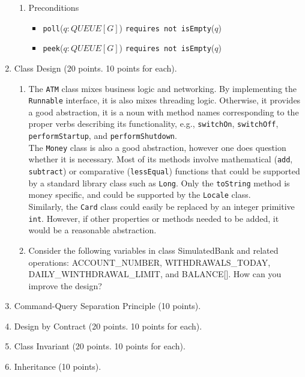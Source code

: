 \documentclass{report}
\begin{document}
\begin{enumerate}
\begin{enumerate}
		\item Preconditions		
		\begin{itemize}
			\item \texttt{poll}($q: QUEUE[G]$) \texttt{requires not isEmpty}($q$)
            \item \texttt{peek}($q: QUEUE[G]$) \texttt{requires not isEmpty}($q$)
		\end{itemize}
	\end{enumerate}

	\item Class Design (20 points. 10 points for each).
	
	\begin{enumerate}
		\item 
		The \texttt{ATM} class mixes business logic and networking. By implementing the \texttt{Runnable} interface, it is also mixes threading logic. Otherwise, 
		it provides a good abstraction, it is a noun with method names corresponding
		to the proper verbs describing its functionality, e.g., \texttt{switchOn},
		\texttt{switchOff}, \texttt{performStartup}, and \texttt{performShutdown}. \\
		
		The \texttt{Money} class is also a good abstraction, however one does question
		whether it is necessary. Most of its methods involve mathematical
    	(\texttt{add}, \texttt{subtract}) or comparative (\texttt{lessEqual})
    	functions that could be supported by a standard library class such as \texttt{Long}. Only the \texttt{toString} method is money specific,
    	and could be supported by the \texttt{Locale} class. \\
    	
    	Similarly, the \texttt{Card} class could easily be replaced by an
    	integer primitive \texttt{int}. However, if other properties or methods
    	needed to be added, it would be a reasonable abstraction.
		
		\item Consider the following variables in class SimulatedBank and related operations: ACCOUNT\_NUMBER, WITHDRAWALS\_TODAY, DAILY\_WINTHDRAWAL\_LIMIT, and BALANCE[]. How can you improve the design?
	\end{enumerate}

	\item Command-Query Separation Principle (10 points).
	
	\item Design by Contract  (20 points. 10 points for each).
	
	\item Class Invariant  (20 points. 10 points for each).
	
    \item Inheritance (10 points).

\end{enumerate}
\end{document}
